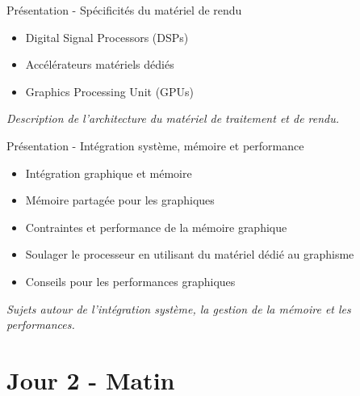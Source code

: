 \documentclass[a4paper,12pt,obeyspaces,spaces,hyphens]{article}
\begin{document}
\feagendatwocolumn
{Présentation - Spécificités du matériel de rendu}
{
  \begin{itemize}
  \item Digital Signal Processors (DSPs)
  \item Accélérateurs matériels dédiés
  \item Graphics Processing Unit (GPUs)
  \end{itemize}
  \vspace{0.5em}
  {\em Description de l'architecture du matériel de traitement et de rendu.}
}
{Présentation - Intégration système, mémoire et performance}
{
  \begin{itemize}
  \item Intégration graphique et mémoire
  \item Mémoire partagée pour les graphiques
  \item Contraintes et performance de la mémoire graphique
  \item Soulager le processeur en utilisant du matériel dédié au graphisme
  \item Conseils pour les performances graphiques
  \end{itemize}
  \vspace{0.5em}
  {\em Sujets autour de l'intégration système, la gestion de la mémoire et les performances.}
}

\section{Jour 2 - Matin}
\end{document}

